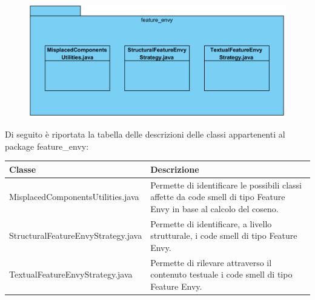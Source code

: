 \documentclass[11pt]{article}
\begin{document}
\begin{description}
				\item[ 2.1.1.2.3 Package feature\_envy] 
				\item \begin{figure}[!h]
					\centering
					\includegraphics{diagrams/Feature_EnvyPackageDiagram}
				\end{figure}
				Di seguito è riportata la tabella delle descrizioni delle classi appartenenti al package feature\_envy:
				\item \begin{tabular}{|p{}|p{}|}
					\hline
					\textbf{Classe} & \textbf{Descrizione}\\
					\hline
					MisplacedComponentsUtilities.java & Permette di identificare le possibili classi affette da code smell di tipo Feature Envy in base al calcolo del coseno. \\
					\hline
					StructuralFeatureEnvyStrategy.java & Permette di identificare, a livello strutturale, i code smell di tipo Feature Envy. \\
					\hline
					TextualFeatureEnvyStrategy.java & Permette di rilevare attraverso il contenuto testuale i code smell di tipo Feature Envy. \\
					\hline
				\end{tabular}
				

\end{description}
\end{document}
